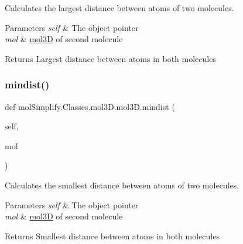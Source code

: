 Calculates the largest distance between atoms of two molecules. 


\begin{DoxyParams}{Parameters}
{\em self} & The object pointer \\
\hline
{\em mol} & \hyperlink{classmolSimplify_1_1Classes_1_1mol3D_1_1mol3D}{mol3D} of second molecule \\
\hline
\end{DoxyParams}
\begin{DoxyReturn}{Returns}
Largest distance between atoms in both molecules 
\end{DoxyReturn}
\mbox{\label{classmolSimplify_1_1Classes_1_1mol3D_1_1mol3D_ab051fea5908eab8ddcd39d4ea4688657}} 
\subsubsection{\texorpdfstring{mindist()}{mindist()}}
{\footnotesize\ttfamily def mol\+Simplify.\+Classes.\+mol3\+D.\+mol3\+D.\+mindist (\begin{DoxyParamCaption}\item[{}]{self,  }\item[{}]{mol }\end{DoxyParamCaption})}



Calculates the smallest distance between atoms of two molecules. 


\begin{DoxyParams}{Parameters}
{\em self} & The object pointer \\
\hline
{\em mol} & \hyperlink{classmolSimplify_1_1Classes_1_1mol3D_1_1mol3D}{mol3D} of second molecule \\
\hline
\end{DoxyParams}
\begin{DoxyReturn}{Returns}
Smallest distance between atoms in both molecules 
\end{DoxyReturn}
\mbox{\label{classmolSimplify_1_1Classes_1_1mol3D_1_1mol3D_abc383cd8e5f7a2963b5b220fe5f23c02}} 

